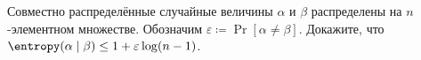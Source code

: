 Совместно распределённые случайные величины $\alpha$ и $\beta$ распределены на $n$-элементном
множестве. Обозначим $\varepsilon \coloneqq \Pr[\alpha \neq \beta]$. Докажите, что 
$\entropy(\alpha \mid \beta) \le 1 + \varepsilon \log (n - 1)$.